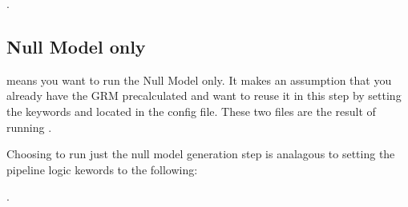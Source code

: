 \documentclass[letterpaper,10pt,english]{sphinxmanual}
\begin{document}
         .

\begin{sphinxVerbatim}[commandchars=\\\{\}]
\end{sphinxVerbatim}


\subsection{Null Model only}
\label{\detokenize{exampleWorkFlows:null-model-only}}
 means you want to run the Null Model only.  It makes an assumption that you already have the GRM pre\sphinxhyphen{}calculated and want to re\sphinxhyphen{}use it in this step by setting the keywords  and  located in the config file.  These two files are the result of running .

Choosing to run just the null model generation step is analagous to setting the pipeline logic kewords to the following:

\begin{sphinxVerbatim}[commandchars=\\\{\}]
\end{sphinxVerbatim}

        .
\end{document}
